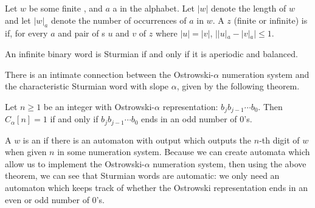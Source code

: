 Let $w$ be some finite \word, and $a$ a  in the alphabet.
Let $|w|$ denote the length of $w$ and let $|w|_a$ denote the number of occurrences of $a$ in $w$.
A \word $z$ (finite or infinite) is  if, for every  $a$ and pair of \factor{}s $u$ and $v$ of $z$ where $|u| = |v|$, $||u|_a - |v|_a| \leq 1$.

\begin{theorem}\label{thm:comb-sturmian-def}
An infinite binary word is Sturmian if and only if it is aperiodic and balanced.
\end{theorem}

There is an intimate connection between the Ostrowski-$\alpha$ numeration system and the characteristic Sturmian word with slope $\alpha$, given by the following theorem.

\begin{theorem}\label{thm:ostrowski-sturmian}
Let $n \geq 1$ be an integer with Ostrowski-$\alpha$ representation: $b_j b_{j-1} \cdots b_0$.
Then $C_{\alpha}[n] = 1$ if and only if $b_j b_{j-1} \cdots b_0$ ends in an odd number of $0$'s.
\end{theorem}

A \word $w$ is an  if there is an automaton with output which outputs the $n$-th digit of $w$ when given $n$ in some numeration system.
Because we can create automata which allow us to implement the Ostrowski-$\alpha$ numeration system, then using the above theorem, we can see that Sturmian words are automatic: we only need an automaton which keeps track of whether the Ostrowski representation ends in an even or odd number of $0$'s.
